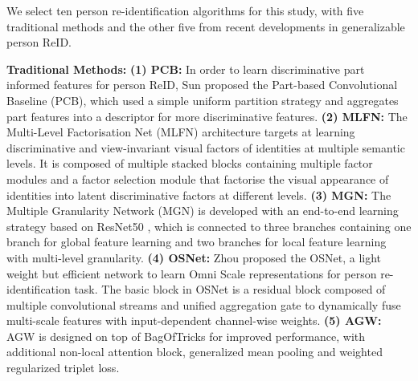\documentclass[10pt,twocolumn,letterpaper]{article}
\begin{document}
We select ten person re-identification algorithms for this study, with five traditional methods and the other five from recent developments in generalizable person ReID.

\textbf{Traditional Methods:}
\textbf{(1) PCB:} In order to learn discriminative part informed features for person ReID, Sun \etal \cite{sun2018pcb} proposed the Part-based Convolutional Baseline (PCB), which used a simple uniform partition strategy and aggregates part features into a descriptor for more discriminative features. 
\textbf{(2) MLFN:} The Multi-Level Factorisation Net (MLFN) architecture \cite{chang18mlfn} targets at learning discriminative and view-invariant visual factors of identities at multiple semantic levels. It is composed of multiple stacked blocks containing multiple factor modules and a factor selection module that factorise the visual appearance of identities into latent discriminative factors at different levels. 
\textbf{(3) MGN:} The Multiple Granularity Network (MGN) \cite{wang2018learning} is developed with an end-to-end learning strategy based on ResNet50 \cite{he2016deep}, which is connected to three branches containing one branch for global feature learning and two branches for local feature learning with multi-level granularity. 
\textbf{(4) OSNet:} Zhou \etal \cite{Zhou2019-OSNet} proposed the OSNet, a light weight but efficient network to learn Omni Scale representations for person re-identification task. The basic block in OSNet is a residual block composed of multiple convolutional streams and unified aggregation gate to dynamically fuse multi-scale features with input-dependent channel-wise weights. 
\textbf{(5) AGW:} AGW \cite{ye2022survey} is designed on top of BagOfTricks \cite{Luo19BOT} for improved performance, with additional non-local attention block, generalized mean pooling and weighted regularized triplet loss.
\end{document}
